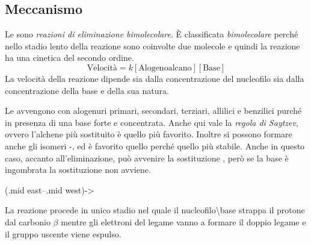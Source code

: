 
\subsection{Meccanismo \texorpdfstring{\mech[e2]}{E2}}
Le \textbf{\mech[e2]} sono \textit{reazioni di eliminazione bimolecolare}. È classificata \textit{bimolecolare} perché nello stadio lento della reazione sono coinvolte due molecole e quindi la reazione ha una cinetica del secondo ordine.
\begin{equation*}
	\text{Velocità} = k\left[\text{Alogenoalcano}\right]\left[\text{Base}\right]
\end{equation*}
La velocità della reazione dipende sia dalla concentrazione del nucleofilo sia dalla concentrazione della base e della sua natura.

Le \mech[e2] avvengono con alogenuri primari, secondari, terziari, allilici e benzilici purché in presenza di una base forte e concentrata. Anche qui vale la \textit{regola di Saytzev}, ovvero l'alchene più sostituito è quello più favorito. Inoltre si possono formare anche gli isomeri \cis-\trans, ed è favorito quello \trans\;perché quello più stabile. Anche in questo caso, accanto all'eliminazione, può avvenire la sostituzione \mech[2], però se la base è ingombrata la sostituzione non avviene.

\chemnameinit{}
\begin{reaction}
	\+
	\arrow(.mid east--.mid west){->}
	\+
	\+
\end{reaction}
\chemnameinit{}

La reazione procede in unico stadio nel quale il nucleofilo\textbackslash base strappa il protone dal carbonio \(\beta\) mentre gli elettroni del legame  vanno a formare il doppio legame e il gruppo uscente viene espulso.

